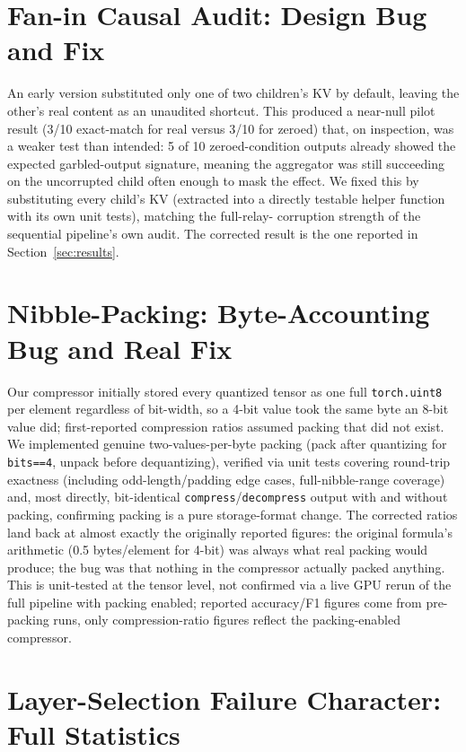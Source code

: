 \documentclass[11pt]{article}
\begin{document}
\section{Fan-in Causal Audit: Design Bug and Fix}
\label{app:faninbug}

An early version substituted only one of two children's KV by default,
leaving the other's real content as an unaudited shortcut. This
produced a near-null pilot result (3/10 exact-match for real versus
3/10 for zeroed) that, on inspection, was a weaker test than intended:
5 of 10 zeroed-condition outputs already showed the expected
garbled-output signature, meaning the aggregator was still succeeding
on the uncorrupted child often enough to mask the effect. We fixed this
by substituting every child's KV (extracted into a directly testable
helper function with its own unit tests), matching the full-relay-
corruption strength of the sequential pipeline's own audit. The
corrected result is the one reported in Section~\ref{sec:results}.

\section{Nibble-Packing: Byte-Accounting Bug and Real Fix}
\label{app:nibble}

Our compressor initially stored every quantized tensor as one full
\texttt{torch.uint8} per element regardless of bit-width, so a 4-bit
value took the same byte an 8-bit value did; first-reported compression
ratios assumed packing that did not exist. We implemented genuine
two-values-per-byte packing (pack after quantizing for \texttt{bits==4},
unpack before dequantizing), verified via unit tests covering
round-trip exactness (including odd-length/padding edge cases,
full-nibble-range coverage) and, most directly, bit-identical
\texttt{compress}/\texttt{decompress} output with and without packing,
confirming packing is a pure storage-format change. The corrected
ratios land back at almost exactly the originally reported figures: the
original formula's arithmetic (0.5 bytes/element for 4-bit) was always
what real packing would produce; the bug was that nothing in the
compressor actually packed anything. This is unit-tested at the tensor
level, not confirmed via a live GPU rerun of the full pipeline with
packing enabled; reported accuracy/F1 figures come from pre-packing
runs, only compression-ratio figures reflect the packing-enabled
compressor.

\section{Layer-Selection Failure Character: Full Statistics}
\label{app:failurechar}
\end{document}
